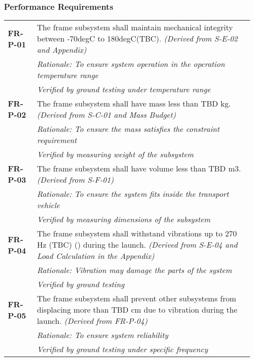 \subsubsection*{Performance Requirements}
\vspace{-15pt}
\begin{longtable}{P{2cm}P{13.25cm}}
\textbf{FR-P-01}	&
The frame subsystem shall maintain mechanical integrity between -70\gls{degC} to 180\gls{degC}(\gls{TBC}).
\textit{(Derived from S-E-02 and Appendix)}	\\
& \textit{Rationale: To ensure system operation in the operation temperature range} \\
& \textit{Verified by ground testing under temperature range}	\\

\textbf{FR-P-02}	&
The frame subsystem shall have mass less than \gls{TBD} \gls{kg}.
\textit{(Derived from S-C-01 and Mass Budget)}	\\
& \textit{Rationale: To ensure the mass satisfies the constraint requirement} \\
& \textit{Verified by measuring weight of the subsystem}	\\

\textbf{FR-P-03}	&
The frame subsystem shall have volume less than \gls{TBD} \gls{m3}.
\textit{(Derived from S-F-01)}	\\
& \textit{Rationale: To ensure the system fits inside the transport vehicle} \\
& \textit{Verified by measuring dimensions of the subsystem}	\\

\textbf{FR-P-04}	& The frame subsystem shall withstand vibrations up to 270 \gls{Hz} (\gls{TBC}) () during the launch.
\textit{(Derived from S-E-04 and Load Calculation in the Appendix)}	\\
& \textit{Rationale: Vibration may damage the parts of the system} \\
& \textit{Verified by ground testing}	\\

\textbf{FR-P-05}	&
The frame subsystem shall prevent other subsystems from displacing more than \gls{TBD} \gls{cm} due to vibration during the launch.
\textit{(Derived from FR-P-04)}	\\
& \textit{Rationale: To ensure system reliability} \\
& \textit{Verified by ground testing under specific frequency}	\\


\end{longtable}
